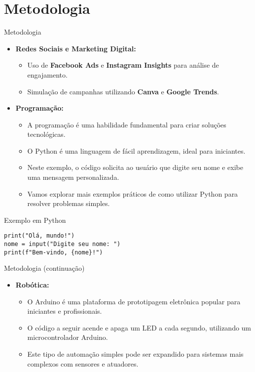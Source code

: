 \documentclass{beamer}
\begin{document}
\section{Metodologia}
\begin{frame}{Metodologia}
    \begin{itemize}
        \item \textbf{Redes Sociais e Marketing Digital:}
        \begin{itemize}
            \item Uso de \textbf{Facebook Ads} e \textbf{Instagram Insights} para análise de engajamento.
            \item Simulação de campanhas utilizando \textbf{Canva} e \textbf{Google Trends}.
        \end{itemize}
        \item \textbf{Programação:}
            \begin{itemize}
                \item A programação é uma habilidade fundamental para criar soluções tecnológicas.
                \item O Python é uma linguagem de fácil aprendizagem, ideal para iniciantes.
                \item Neste exemplo, o código solicita ao usuário que digite seu nome e exibe uma mensagem personalizada.
                \item Vamos explorar mais exemplos práticos de como utilizar Python para resolver problemas simples.
            \end{itemize}
        \end{itemize}
\end{frame}

\begin{frame}[fragile]{Exemplo em Python}
\begin{verbatim}
print("Olá, mundo!")
nome = input("Digite seu nome: ")
print(f"Bem-vindo, {nome}!")
\end{verbatim}
\end{frame}

\begin{frame}{Metodologia (continuação)}
    \begin{itemize}
        \item \textbf{Robótica:}
        \begin{itemize}
            \item O Arduino é uma plataforma de prototipagem eletrônica popular para iniciantes e profissionais.
            \item O código a seguir acende e apaga um LED a cada segundo, utilizando um microcontrolador Arduino.
            \item Este tipo de automação simples pode ser expandido para sistemas mais complexos com sensores e atuadores.
        \end{itemize}
    \end{itemize}
\end{frame}
\end{document}
